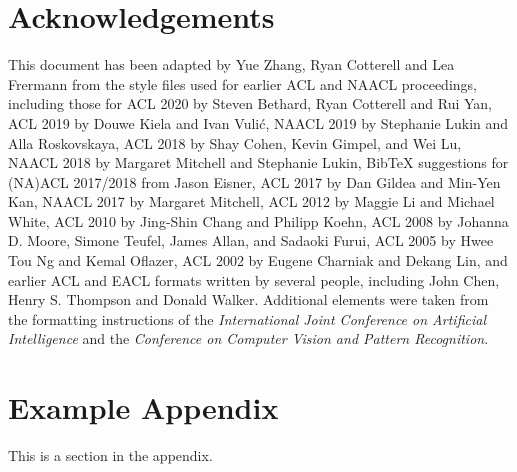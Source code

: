 \documentclass[11pt]{article}
\begin{document}
\section*{Acknowledgements}
This document has been adapted by Yue Zhang, Ryan Cotterell and Lea Frermann from the style files used for earlier ACL and NAACL proceedings, including those for 
ACL 2020 by Steven Bethard, Ryan Cotterell and Rui Yan,
ACL 2019 by Douwe Kiela and Ivan Vuli\'{c},
NAACL 2019 by Stephanie Lukin and Alla Roskovskaya, 
ACL 2018 by Shay Cohen, Kevin Gimpel, and Wei Lu, 
NAACL 2018 by Margaret Mitchell and Stephanie Lukin,
Bib\TeX{} suggestions for (NA)ACL 2017/2018 from Jason Eisner,
ACL 2017 by Dan Gildea and Min-Yen Kan, NAACL 2017 by Margaret Mitchell, 
ACL 2012 by Maggie Li and Michael White, 
ACL 2010 by Jing-Shin Chang and Philipp Koehn, 
ACL 2008 by Johanna D. Moore, Simone Teufel, James Allan, and Sadaoki Furui, 
ACL 2005 by Hwee Tou Ng and Kemal Oflazer, 
ACL 2002 by Eugene Charniak and Dekang Lin, 
and earlier ACL and EACL formats written by several people, including
John Chen, Henry S. Thompson and Donald Walker.
Additional elements were taken from the formatting instructions of the \emph{International Joint Conference on Artificial Intelligence} and the \emph{Conference on Computer Vision and Pattern Recognition}.




\appendix

\section{Example Appendix}
\label{sec:appendix}

This is a section in the appendix.
\end{document}
